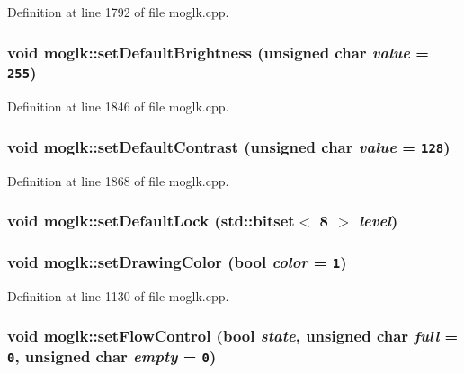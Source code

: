 Definition at line 1792 of file moglk.cpp.\hypertarget{classmoglk_2a1af82f5cef9e807e43e2a9fa2636e2}{
\subsubsection[{setDefaultBrightness}]{\setlength{\rightskip}{0pt plus 5cm}void moglk::setDefaultBrightness (unsigned char {\em value} = {\tt 255})}}
\label{classmoglk_2a1af82f5cef9e807e43e2a9fa2636e2}




Definition at line 1846 of file moglk.cpp.\hypertarget{classmoglk_665a6e5ce6e0ba5b49a888e048bd4541}{
\subsubsection[{setDefaultContrast}]{\setlength{\rightskip}{0pt plus 5cm}void moglk::setDefaultContrast (unsigned char {\em value} = {\tt 128})}}
\label{classmoglk_665a6e5ce6e0ba5b49a888e048bd4541}




Definition at line 1868 of file moglk.cpp.\hypertarget{classmoglk_1f658975ec72ee94a416e03b80d940ec}{
\subsubsection[{setDefaultLock}]{\setlength{\rightskip}{0pt plus 5cm}void moglk::setDefaultLock (std::bitset$<$ 8 $>$ {\em level})}}
\label{classmoglk_1f658975ec72ee94a416e03b80d940ec}


\hypertarget{classmoglk_a1345114c86c6834619cf9a335458b96}{
\subsubsection[{setDrawingColor}]{\setlength{\rightskip}{0pt plus 5cm}void moglk::setDrawingColor (bool {\em color} = {\tt 1})}}
\label{classmoglk_a1345114c86c6834619cf9a335458b96}




Definition at line 1130 of file moglk.cpp.\hypertarget{classmoglk_09137664a708707066b2705b3a6d6894}{
\subsubsection[{setFlowControl}]{\setlength{\rightskip}{0pt plus 5cm}void moglk::setFlowControl (bool {\em state}, \/  unsigned char {\em full} = {\tt 0}, \/  unsigned char {\em empty} = {\tt 0})}}
\label{classmoglk_09137664a708707066b2705b3a6d6894}




